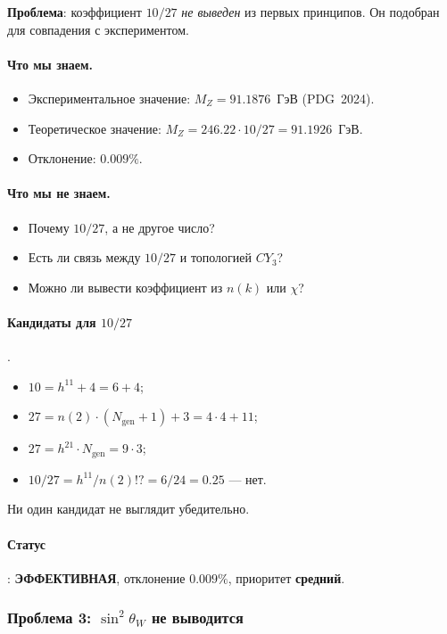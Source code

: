 \documentclass[11pt,a4paper]{article}
\newcommand{\CY}{\ensuremath{CY_3}}
\theoremstyle{definition}
\begin{document}
\medskip\noindent
\textbf{Проблема}: коэффициент $10/27$ \emph{не выведен}
из первых принципов. Он подобран для совпадения с экспериментом.

\paragraph{Что мы знаем.}
\begin{itemize}
    \item Экспериментальное значение:
          $M_Z = 91.1876$~ГэВ (PDG~2024).
    \item Теоретическое значение:
          $M_Z = 246.22 \cdot 10/27 = 91.1926$~ГэВ.
    \item Отклонение: $0.009\%$.
\end{itemize}

\paragraph{Что мы не знаем.}
\begin{itemize}
    \item Почему $10/27$, а не другое число?
    \item Есть ли связь между $10/27$ и топологией $\CY$?
    \item Можно ли вывести коэффициент из $n(k)$ или
          $\chi$?
\end{itemize}

\paragraph{Кандидаты для \texorpdfstring{$10/27$}{10/27}}.
\begin{itemize}
    \item $10 = h^{11} + 4 = 6 + 4$;
    \item $27 = n(2) \cdot (N_{\text{gen}} + 1) + 3 = 4 \cdot 4 + 11$;
    \item $27 = h^{21} \cdot N_{\text{gen}} = 9 \cdot 3$;
    \item $10/27 = h^{11}/n(2)!? = 6/24 = 0.25$ --- нет.
\end{itemize}
Ни один кандидат не выглядит убедительно.

\paragraph{Статус}: \textbf{ЭФФЕКТИВНАЯ}, отклонение $0.009\%$,
приоритет \textbf{средний}.

\subsubsection{Проблема 3: \texorpdfstring{$\sin^2\theta_W$}{\textasciicircum 2\_W} не выводится}
\end{document}
